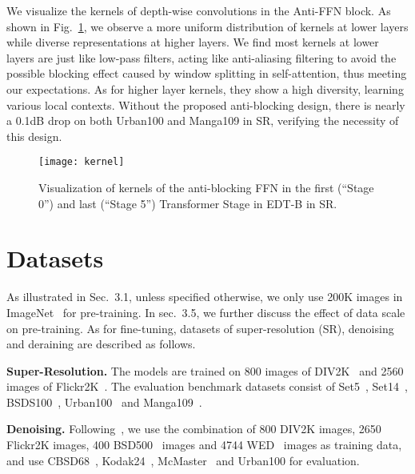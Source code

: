 \documentclass[runningheads]{llncs}
\begin{document}
\vspace{0.05in}
	 We visualize the kernels of depth-wise convolutions in the Anti-FFN block. As shown in Fig.~\ref{fig:kernel}, we observe a more uniform distribution of kernels at lower layers while diverse representations at higher layers. We find most kernels at lower layers are just like low-pass filters, acting like anti-aliasing filtering to avoid the possible blocking effect caused by window splitting in self-attention, thus meeting our expectations. As for higher layer kernels, they show a high diversity, learning various local contexts. Without the proposed anti-blocking design, there is nearly a 0.1dB drop on both Urban100 and Manga109 in  SR, verifying the necessity of this design.
	
	\begin{figure}[t]
		\begin{center}
			\texttt{[image: kernel]}
		\end{center}
		\vspace{-0.2in}
		\caption{Visualization of kernels of the anti-blocking FFN in the first (``Stage 0'') and last (``Stage 5'') Transformer Stage in EDT-B in  SR.}
		\label{fig:kernel}
		\vspace{-0.05in}
	\end{figure}
	


	\section{Datasets}
	
	As illustrated in Sec.~{3.1}, unless specified otherwise, we only use 200K images in ImageNet~\cite{deng2009imagenet} for pre-training. In sec.~{3.5}, we further discuss the effect of data scale on pre-training. As for fine-tuning, datasets of super-resolution (SR), denoising and deraining are described as follows.
	
	\vspace{0.05in}
	\noindent\textbf{Super-Resolution.} The models are trained on 800 images of DIV2K~\cite{agustsson2017ntire} and 2560 images of Flickr2K~\cite{timofte2017ntire}. The evaluation benchmark datasets consist of Set5~\cite{bevilacqua2012low}, Set14~\cite{zeyde2010single}, BSDS100~\cite{martin2001database}, Urban100~\cite{huang2015single} and Manga109~\cite{matsui2017sketch}.
	
	\vspace{0.05in}
	\noindent\textbf{Denoising.} Following~\cite{zhang2020residual,zhang2021plug,liang2021swinir}, we use the combination of 800 DIV2K images, 2650 Flickr2K images, 400 BSD500~\cite{arbelaez2010contour} images and 4744 WED~\cite{ma2016waterloo} images as training data, and use CBSD68~\cite{martin2001database}, Kodak24~\cite{richdodak}, McMaster~\cite{zhang2011color} and Urban100 for evaluation.
	
\end{document}
